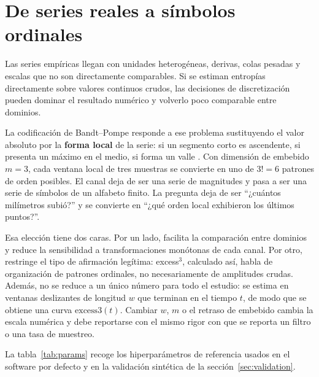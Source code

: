 \documentclass[11pt,a4paper]{article}
\begin{document}
\section{De series reales a s\'imbolos ordinales}
\label{sec:simbolos}

Las series emp\'iricas llegan con unidades heterog\'eneas, derivas,
colas pesadas y escalas que no son directamente comparables. Si se estiman
entrop\'ias directamente sobre valores continuos crudos, las decisiones de
discretizaci\'on pueden dominar el resultado num\'erico y volverlo poco
comparable entre dominios.

La codificaci\'on de Bandt--Pompe responde a ese problema sustituyendo el
valor absoluto por la \textbf{forma local} de la serie: si un segmento
corto es ascendente, si presenta un m\'aximo en el medio, si forma un valle
\citep{BandtPompe2002}. Con dimensi\'on de embebido $m=3$, cada ventana
local de tres muestras se convierte en uno de $3!=6$ patrones de orden
posibles. El canal deja de ser una serie de magnitudes y pasa a ser una
serie de s\'imbolos de un alfabeto finito. La pregunta deja de ser
``¿cu\'antos mil\'imetros subi\'o?'' y se convierte en ``¿qu\'e orden local
exhibieron los \'ultimos puntos?''.

Esa elecci\'on tiene dos caras. Por un lado, facilita la comparaci\'on entre
dominios y reduce la sensibilidad a transformaciones mon\'otonas de cada
canal. Por otro, restringe el tipo de afirmaci\'on leg\'itima: excess$^3$,
calculado as\'i, habla de organizaci\'on de patrones ordinales, no
necesariamente de amplitudes crudas. Adem\'as, no se reduce a un \'unico
n\'umero para todo el estudio: se estima en ventanas deslizantes de longitud
$w$ que terminan en el tiempo $t$, de modo que se obtiene una curva
$\mathrm{excess3}(t)$. Cambiar $w$, $m$ o el retraso de embebido cambia la
escala num\'erica y debe reportarse con el mismo rigor con que se reporta un
filtro o una tasa de muestreo.

La tabla~\ref{tab:params} recoge los hiperpar\'ametros de referencia usados
en el software por defecto y en la validaci\'on sint\'etica de la
secci\'on~\ref{sec:validation}.
\end{document}
